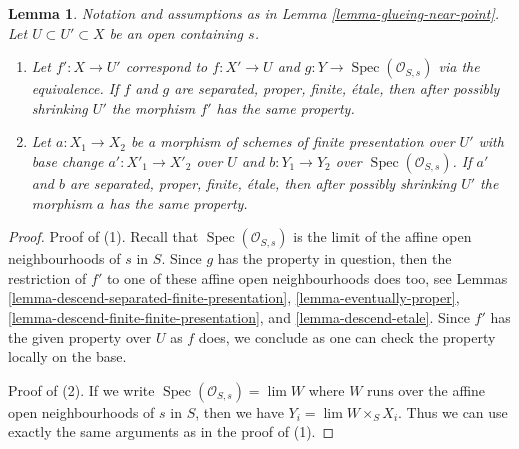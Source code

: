 \documentclass[10pt,a4paper]{amsart}
\theoremstyle{plain}
\newtheorem{lemma}[subsection]{Lemma}
\theoremstyle{definition}
\theoremstyle{remark}
\numberwithin{equation}{subsection}
\def\lim{\mathop{\mathrm{lim}}\nolimits}
\def\Spec{\mathop{\mathrm{Spec}}}
\begin{document}
\begin{lemma}
\label{lemma-glueing-near-point-properties}
Notation and assumptions as in Lemma \ref{lemma-glueing-near-point}.
Let $U \subset U' \subset X$ be an open containing $s$.
\begin{enumerate}
\item  Let $f' : X \to U'$ correspond to $f : X' \to U$ and
$g : Y \to \Spec(\mathcal{O}_{S, s})$
via the equivalence. If $f$ and $g$ are separated, proper, finite, \'etale,
then after possibly shrinking $U'$ the morphism $f'$ has the same property.
\item Let $a : X_1 \to X_2$
be a morphism of schemes of finite presentation over $U'$
with base change $a' : X'_1 \to X'_2$ over $U$ and
$b : Y_1 \to Y_2$ over $\Spec(\mathcal{O}_{S, s})$.
If $a'$ and $b$ are separated, proper, finite, \'etale,
then after possibly shrinking $U'$ the morphism $a$ has the same property.
\end{enumerate}
\end{lemma}

\begin{proof}
Proof of (1). Recall that $\Spec(\mathcal{O}_{S, s})$ is the limit of the
affine open neighbourhoods of $s$ in $S$. Since $g$ has the property
in question, then the restriction of $f'$ to one of these
affine open neighbourhoods does too, see
Lemmas \ref{lemma-descend-separated-finite-presentation},
\ref{lemma-eventually-proper},
\ref{lemma-descend-finite-finite-presentation}, and
\ref{lemma-descend-etale}.
Since $f'$ has the given property over $U$ as $f$ does,
we conclude as one can check the property locally on the base.

\medskip\noindent
Proof of (2). If we write $\Spec(\mathcal{O}_{S, s}) = \lim W$
where $W$ runs over the affine open neighbourhoods of $s$ in $S$,
then we have $Y_i = \lim W \times_S X_i$. Thus we can use
exactly the same arguments as in the proof of (1).
\end{proof}
\end{document}
